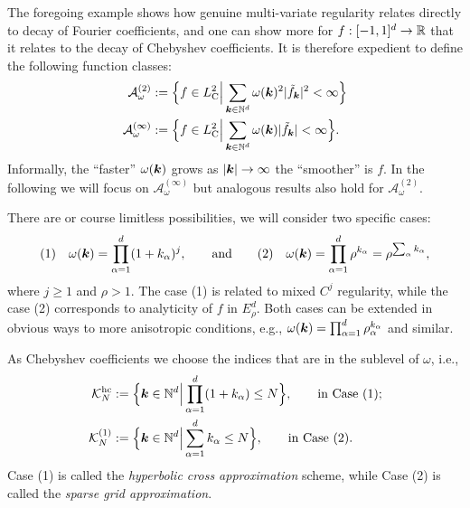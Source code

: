 The foregoing example shows how genuine multi-variate regularity 
relates directly to decay of Fourier coefficients, and one can show more 
for $f: [-1,1]^d \to \mathbb{R}$ that it relates to the decay of Chebyshev 
coefficients. It is therefore expedient to define the following function classes:
\begin{align*}
    \mathcal{A}_\omega^{(2)} 
    &:= 
        \Big\{ f \in L^2_{\rm C} \Big| 
             \sum_{{\bm k} \in \mathbb{N}^d} \omega({\bm k})^2 |\tilde{f}_{\bm k}|^2 < \infty \Big\} \\ 
    \mathcal{A}_\omega^{(\infty)} 
    &:= 
    \Big\{ f \in L^2_{\rm C} \Big| 
    \sum_{{\bm k} \in \mathbb{N}^d} \omega({\bm k}) |\tilde{f}_{\bm k}| < \infty \Big\}.
\end{align*}
Informally, the ``faster'' $\omega({\bm k})$ grows as $|{\bm k}| \to \infty$ the
``smoother'' is $f$. In the following we will focus on
$\mathcal{A}_\omega^{(\infty)}$ but analogous results also hold for
$\mathcal{A}_\omega^{(2)}$. 

There are or course limitless possibilities, we will consider two specific
cases: 
\[
    (1) \quad \omega({\bm k}) = \prod_{\alpha = 1}^d (1+k_\alpha)^j, 
    \qquad \text{and} \qquad 
    (2) \quad \omega({\bm k}) = \prod_{\alpha = 1}^d \rho^{k_\alpha} = \rho^{\sum_\alpha k_\alpha},
\]
where $j \geq 1$ and $\rho > 1$. The case (1) is related to mixed $C^j$
regularity, while the case (2) corresponds to analyticity of $f$ in
$E_{\rho}^d$. Both cases can be extended in obvious ways to more anisotropic
conditions, e.g., $\omega({\bm k}) = \prod_{\alpha = 1}^d \rho_\alpha^{k_\alpha}$
and similar.

As Chebyshev coefficients we choose the indices that are in the 
sublevel of $\omega$, i.e., 
\begin{align*}
    \mathcal{K}_N^{\rm hc} &:= \Big\{ {\bm k} \in \mathbb{N}^d \Big| \prod_{\alpha=1}^d (1+k_\alpha) \leq N \Big\}, 
    \qquad \text{in Case (1);} \\ 
    \mathcal{K}_N^{(1)} &:= \Big\{ {\bm k}  \in \mathbb{N}^d \Big| \sum_{\alpha = 1}^d k_\alpha \leq N \Big\},
    \qquad \text{in Case (2).}
\end{align*}
Case (1) is called the {\em hyperbolic cross approximation} scheme, while Case
(2) is called the {\em sparse grid approximation}.


